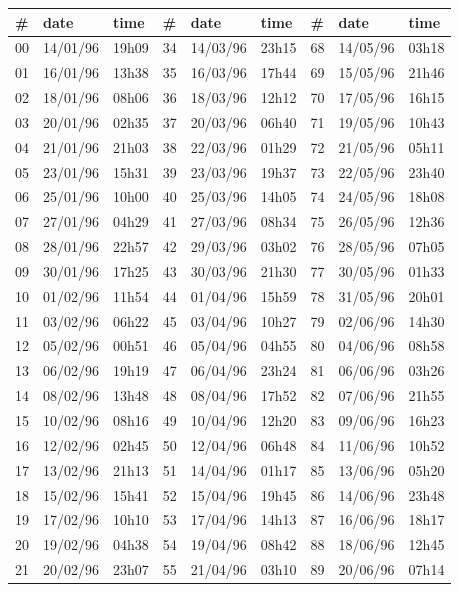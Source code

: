 \documentclass{tufte-handout}
\begin{document}
\begin{table}
\begin{tabular}{lll|lll|lll}
\# & date & time & \# & date & time & \# & date & time \\ \hline
00 & 14/01/96 & 19h09 & 34 & 14/03/96 & 23h15 & 68 & 14/05/96 & 03h18\\
01 & 16/01/96 & 13h38 & 35 & 16/03/96 & 17h44 & 69 & 15/05/96 & 21h46\\
02 & 18/01/96 & 08h06 & 36 & 18/03/96 & 12h12 & 70 & 17/05/96 & 16h15\\
03 & 20/01/96 & 02h35 & 37 & 20/03/96 & 06h40 & 71 & 19/05/96 & 10h43\\
04 & 21/01/96 & 21h03 & 38 & 22/03/96 & 01h29 & 72 & 21/05/96 & 05h11\\
05 & 23/01/96 & 15h31 & 39 & 23/03/96 & 19h37 & 73 & 22/05/96 & 23h40\\
06 & 25/01/96 & 10h00 & 40 & 25/03/96 & 14h05 & 74 & 24/05/96 & 18h08\\
07 & 27/01/96 & 04h29 & 41 & 27/03/96 & 08h34 & 75 & 26/05/96 & 12h36\\
08 & 28/01/96 & 22h57 & 42 & 29/03/96 & 03h02 & 76 & 28/05/96 & 07h05\\
09 & 30/01/96 & 17h25 & 43 & 30/03/96 & 21h30 & 77 & 30/05/96 & 01h33\\
10 & 01/02/96 & 11h54 & 44 & 01/04/96 & 15h59 & 78 & 31/05/96 & 20h01\\
11 & 03/02/96 & 06h22 & 45 & 03/04/96 & 10h27 & 79 & 02/06/96 & 14h30\\
12 & 05/02/96 & 00h51 & 46 & 05/04/96 & 04h55 & 80 & 04/06/96 & 08h58\\
13 & 06/02/96 & 19h19 & 47 & 06/04/96 & 23h24 & 81 & 06/06/96 & 03h26\\
14 & 08/02/96 & 13h48 & 48 & 08/04/96 & 17h52 & 82 & 07/06/96 & 21h55\\
15 & 10/02/96 & 08h16 & 49 & 10/04/96 & 12h20 & 83 & 09/06/96 & 16h23\\
16 & 12/02/96 & 02h45 & 50 & 12/04/96 & 06h48 & 84 & 11/06/96 & 10h52\\
17 & 13/02/96 & 21h13 & 51 & 14/04/96 & 01h17 & 85 & 13/06/96 & 05h20\\
18 & 15/02/96 & 15h41 & 52 & 15/04/96 & 19h45 & 86 & 14/06/96 & 23h48\\
19 & 17/02/96 & 10h10 & 53 & 17/04/96 & 14h13 & 87 & 16/06/96 & 18h17\\
20 & 19/02/96 & 04h38 & 54 & 19/04/96 & 08h42 & 88 & 18/06/96 & 12h45\\
21 & 20/02/96 & 23h07 & 55 & 21/04/96 & 03h10 & 89 & 20/06/96 & 07h14\\

\end{tabular}
\end{table}
\end{document}
